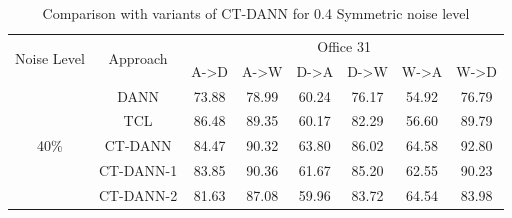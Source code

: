 \vspace{-1.4cm}
\begin{center}
\begin{table}[h!]
    \centering
    \begin{tabular}{|c|c|c|c|c|c|c|c|}
    \hline
    \multirow{2}{3em}{Noise Level} & \multirow{2}{4em}{Approach} &  \multicolumn{6}{|c|}{Office 31}\\
    \cline{3-8}
    & & A->D & A->W & D->A & D->W & W->A & W->D\\
    \hline
    
    \multirow{5}{3em}{40\%} & DANN & 73.88 & 78.99 & 60.24 & 76.17 & 54.92 & 76.79 \\
    & TCL & 86.48 & 89.35 & 60.17 & 82.29 & 56.60 & 89.79\\
    & CT-DANN & 84.47 & 90.32 & 63.80 & 86.02 & 64.58 & 92.80\\
    & CT-DANN-1 & 83.85 & 90.36 & 61.67 & 85.20 & 62.55 & 90.23 \\
    & CT-DANN-2 & 81.63 & 87.08 & 59.96 & 83.72 & 64.54 & 83.98 \\
    \hline
    \end{tabular}
    \caption{Comparison with variants of CT-DANN for 0.4 Symmetric noise level}
    \label{tab:office_var}
    \end{table}
\end{center}
\vspace{-1cm}
\begin{center}
\begin{table}[h!]
    \centering
    \caption{Classification Accuracy (\%) on \textbf{Office-Home} with 40\% Symmetric noise levels}
    \end{table}
\end{center}

